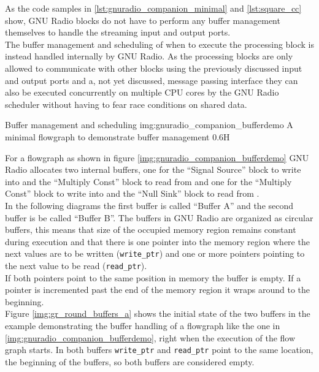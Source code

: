 As the code samples in \autoref{lst:gnuradio_companion_minimal}
and \autoref{lst:square_cc} show, GNU Radio blocks do not have to
perform any buffer management themselves to handle the streaming
input and output ports. \\

The buffer management and scheduling of when to execute the processing
block is instead handled internally by GNU Radio.
As the processing blocks are only allowed to communicate with
other blocks using the previously discussed input and output ports
and a, not yet discussed, message passing interface they can also
be executed concurrently on multiple CPU cores by the GNU Radio scheduler
without having to fear race conditions on shared data. \\

\begin{subchapter}{Buffer management and scheduling}
               {img:gnuradio_companion_bufferdemo}
               {A minimal flowgraph to demonstrate buffer management}
               {0.6}{H}

  For a flowgraph as shown in figure \ref{img:gnuradio_companion_bufferdemo}
  GNU Radio  allocates two internal buffers, one for the ``Signal Source'' block
  to write into and the ``Multiply Const'' block to read from and one for the
  ``Multiply Const'' block to write into and the ``Null Sink'' block to
  read from \cite{grblogbuffers}. \\

  In the following diagrams the first buffer is called ``Buffer A''
  and the second buffer is be called ``Buffer B''.
  The buffers in GNU Radio are organized as circular buffers, this means
  that size of the occupied memory region remains constant during execution
  and that there is one pointer into the memory region where the next
  values are to be written (\texttt{write\_ptr}) and one or more
  pointers pointing to the next value to be read (\texttt{read\_ptr}). \\

  If both pointers point to the same position in memory the buffer is empty.
  If a pointer is incremented past the end of the memory region
  it wraps around to the beginning. \\

  Figure \ref{img:gr_round_buffers_a} shows the initial state of the
  two buffers in the example demonstrating the buffer handling
  of a flowgraph like the one in \autoref{img:gnuradio_companion_bufferdemo},
  right when the execution of the flow graph starts.
  In both buffers \texttt{write\_ptr} and \texttt{read\_ptr}
  point to the same location, the beginning of the buffers,
  so both buffers are considered empty.


\end{subchapter}
